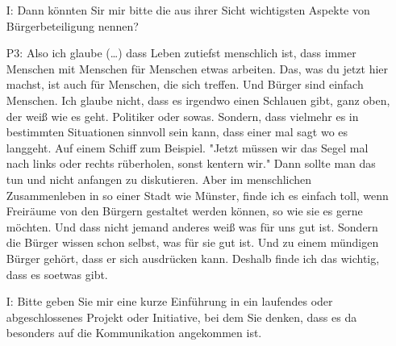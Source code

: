 \begin{itemize}
    Dann das Kulturquartier. Da geht es darum, ganz viele Facetten miteinander zu kombinieren. Weil Kultur ist nicht nur das, was im Theater l{\"a}uft. Also findet nicht auf der B{\"u}hne statt. Kultur ist auch, wie wir beide miteinander umgehen. Kultur ist, wie ich jemandem auf der Stra{\ss}e begegne. Kultur ist, wie ich mein Haus gestalte, damit das nachhaltiger ist, damit auch folgende Generationen noch was (\dots). Also ist so "Wie wollen Menschen miteinander leben" und das an einem Ort, wo man nicht so viel denkt, sondern mehr tut. Mehr ausprobiert. Das ist dieses Kulturquartier was gerade neu entsteht. So das sind so drei Dinge, mit denen ich mich hier in M{\"u}nster besch{\"a}ftige. Da werden aber noch andere Sachen dazukommen. Also, eine Sache wird noch dazukommen, dass ich f{\"u}r M{\"u}nsteraner B{\"u}rger Themen anbiete, wie zum Beispiel "Wie funktioniert intrinsisch motivierte Arbeit". Das geht so ein bisschen dass das Thema Burnout ein bisschen der Vergangenheit angeh{\"o}rt. Das Thema "Happy working people" und "Sinnerf{\"u}lltes Arbeiten -- Wie geht das in M{\"u}nster". Das sind so die vier Themen.
    \item[I:] Dann k{\"o}nnten Sir mir bitte die aus ihrer Sicht wichtigsten Aspekte von B{\"u}rgerbeteiligung nennen?
    \item[P3:] Also ich glaube (\dots) dass Leben zutiefst menschlich ist, dass immer Menschen mit Menschen f{\"u}r Menschen etwas arbeiten. Das, was du jetzt hier machst, ist auch f{\"u}r Menschen, die sich treffen. Und B{\"u}rger sind einfach Menschen. Ich glaube nicht, dass es irgendwo einen Schlauen gibt, ganz oben, der wei{\ss} wie es geht. Politiker oder sowas. Sondern, dass vielmehr es in bestimmten Situationen sinnvoll sein kann, dass einer mal sagt wo es langgeht. Auf einem Schiff zum Beispiel. "Jetzt m{\"u}ssen wir das Segel mal nach links oder rechts r{\"u}berholen, sonst kentern wir." Dann sollte man das tun und nicht anfangen zu diskutieren. Aber im menschlichen Zusammenleben in so einer Stadt wie M{\"u}nster, finde ich es einfach toll, wenn Freir{\"a}ume von den B{\"u}rgern gestaltet werden k{\"o}nnen, so wie sie es gerne m{\"o}chten. Und dass nicht jemand anderes wei{\ss} was f{\"u}r uns gut ist. Sondern die B{\"u}rger wissen schon selbst, was f{\"u}r sie gut ist. Und zu einem m{\"u}ndigen B{\"u}rger geh{\"o}rt, dass er sich ausdr{\"u}cken kann. Deshalb finde ich das wichtig, dass es soetwas gibt.
    \item[I:] Bitte geben Sie mir eine kurze Einf{\"u}hrung in ein laufendes oder abgeschlossenes Projekt oder Initiative, bei dem Sie denken, dass es da besonders auf die Kommunikation angekommen ist.

\end{itemize}
